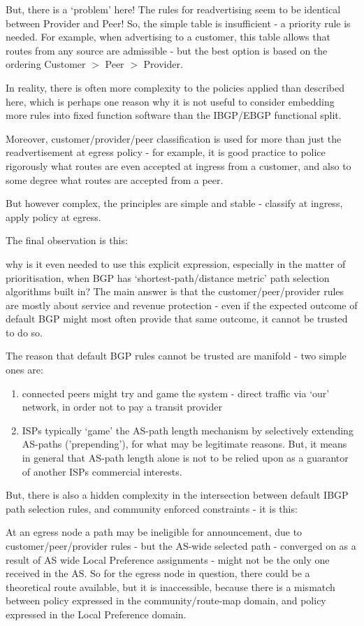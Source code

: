 But, there is a `problem' here!  The rules for readvertising seem to be identical between Provider and Peer!  So, the simple table is insufficient - a priority rule is needed.  For example, when advertising to a customer, this table allows that routes from any source are admissible - but the best option is based on the ordering Customer $>$ Peer $>$ Provider.

In reality, there is often more complexity to the policies applied than described here, which is perhaps one reason why it is not useful to consider embedding more rules into fixed function software than the IBGP/EBGP functional split.

Moreover, customer/provider/peer classification is used for more than just the readvertisement at egress policy - for example, it is good practice to police rigorously what routes are even accepted at ingress from a customer, and also to some degree what routes are accepted from a peer.

But however complex, the principles are simple and stable - classify at ingress, apply policy at egress.

The final observation is this:

why is it even needed to use this explicit expression, especially in the matter of prioritisation, when BGP has `shortest-path/distance metric' path selection algorithms built in?
The main answer is that the customer/peer/provider rules are mostly about service and revenue protection - even if the expected outcome of default BGP might most often provide that same outcome, it cannot be trusted to do so.

The reason that default BGP rules cannot be trusted are manifold - two simple ones are:
\begin{enumerate}
	\item connected peers might try and game the system - direct traffic via `our' network, in order not to pay a transit provider
	\item ISPs typically `game' the AS-path length mechanism by selectively extending AS-paths ('prepending'), for what may be legitimate reasons.  But, it means in general that AS-path length alone is not to be relied upon as a guarantor of another ISPs commercial interests.
\end{enumerate}

But, there is also a hidden complexity in the intersection between default IBGP path selection rules, and community enforced constraints - it is this:

At an egress node a path may be ineligible for announcement, due to customer/peer/provider rules - but the AS-wide selected path - converged on as a result of AS wide Local Preference assignments - might not be the only one received in the AS.  So for the egress node in question, there could be a theoretical route available, but it is inaccessible, because there is a mismatch between policy expressed in the community/route-map domain, and policy expressed in the Local Preference domain.

